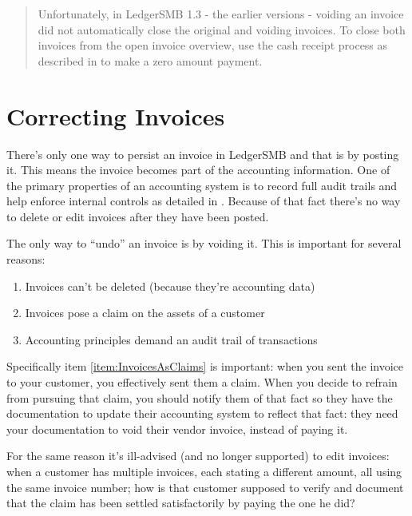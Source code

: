 \begin{quote}
Unfortunately, in LedgerSMB 1.3 - the earlier versions - voiding an invoice did not
automatically close the original and voiding invoices.  To close both invoices from
the open invoice overview, use the cash receipt process as described in
 to make a zero amount payment.
\end{quote}

\section{Correcting Invoices}
\label{sec-business-processes-invoicing-correction-or-deletion}

There's only one way to persist an invoice in LedgerSMB and that is by posting it. This means
the invoice becomes part of the accounting information. One of the primary
properties of an accounting system is to record full audit trails and help enforce
internal controls as detailed in . Because
of that fact there's no way to delete or edit invoices after they have been posted.

The only way to ``undo'' an invoice is by voiding it. This is important for several
reasons:

\begin{enumerate}
\item Invoices can't be deleted (because they're accounting data)
\item Invoices pose a claim on the assets of a \gls{customer}
\label{item:InvoicesAsClaims}
\item Accounting principles demand an audit trail of transactions
\end{enumerate}

Specifically item \ref{item:InvoicesAsClaims} is important: when you sent the invoice
to your \gls{customer}, you effectively sent them a claim. When you decide to refrain from
pursuing that claim, you should notify them of that fact so they have the documentation
to update their accounting system to reflect that fact: they need your documentation
to void their vendor invoice, instead of paying it.

For the same reason it's ill-advised (and no longer supported) to edit invoices:
when a \gls{customer} has multiple invoices, each stating a different amount, all
using the same invoice number; how is that \gls{customer} supposed to verify and document
that the claim has been settled satisfactorily by paying the one he did?

